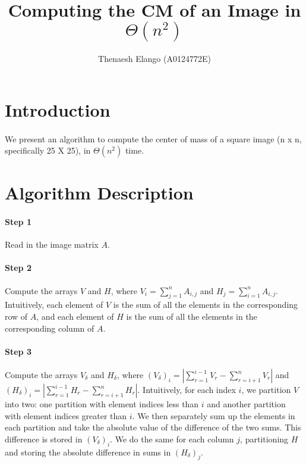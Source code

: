 \documentclass[]{article}
\title{Computing the CM of an Image in $\Theta(n^2)$}
\author{Thenaesh Elango (A0124772E)}
\begin{document}
	
	
	\maketitle
	
	\section{Introduction}
		\paragraph{}
		We present an algorithm to compute the center of mass of a square image (n x n, specifically 25 X 25), in $\Theta(n^2)$ time.
		
	\section{Algorithm Description}
		\paragraph{Step 1}
		Read in the image matrix $A$.
		\paragraph{Step 2}
		Compute the arrays $V$ and $H$, where $V_i = \sum\nolimits_{j = 1}^n A_{i,j}$ and $H_j = \sum\nolimits_{i = 1}^n A_{i,j}$. Intuitively, each element of $V$ is the sum of all the elements in the corresponding row of $A$, and each element of $H$ is the sum of all the elements in the corresponding column of $A$.
		\paragraph{Step 3}
		Compute the arrays $V_\delta$ and $H_\delta$, where $(V_\delta)_i = |\sum\nolimits_{r = 1}^{i - 1} V_r - \sum\nolimits_{r = i + 1}^{n} V_r|$ and $(H_\delta)_i = |\sum\nolimits_{r = 1}^{i - 1} H_r - \sum\nolimits_{r = i + 1}^{n} H_r|$. Intuitively, for each index $i$, we partition $V$ into two: one partition with element indices less than $i$ and another partition with element indices greater than $i$. We then separately sum up the elements in each partition and take the absolute value of the difference of the two sums. This difference is stored in $(V_\delta)_i.$ We do the same for each column $j$, partitioning $H$ and storing the absolute difference in sums in $(H_\delta)_j$.
		
\end{document}
